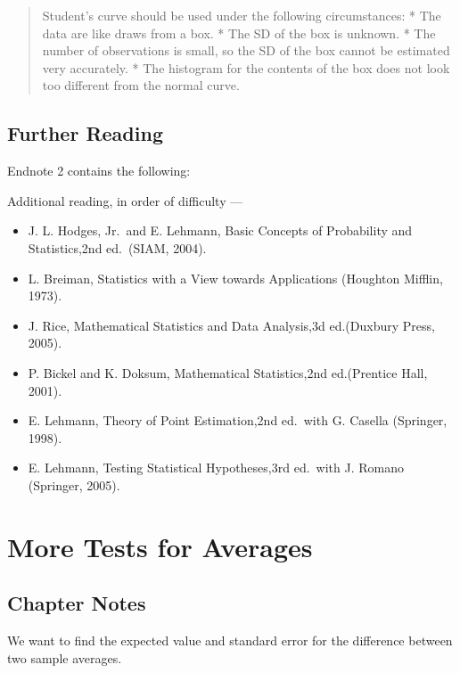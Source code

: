 \documentclass[
]{book}
\providecommand{\tightlist}{%
  \setlength{\itemsep}{0pt}\setlength{\parskip}{0pt}}
\begin{document}
\begin{quote}
Student's curve should be used under the following circumstances:
* The data are like draws from a box.
* The SD of the box is unknown.
* The number of observations is small, so the SD of the box cannot be estimated very accurately.
* The histogram for the contents of the box does not look too different from the normal curve.
\end{quote}

\hypertarget{further-reading-9}{%
\section*{Further Reading}\label{further-reading-9}}

Endnote 2 contains the following:

Additional reading, in order of difficulty ---

\begin{itemize}
\tightlist
\item
  J. L. Hodges, Jr.~and E. Lehmann, Basic Concepts of Probability and Statistics,2nd ed.~(SIAM, 2004).
\item
  L. Breiman, Statistics with a View towards Applications (Houghton Mifflin, 1973).
\item
  J. Rice, Mathematical Statistics and Data Analysis,3d ed.(Duxbury Press, 2005).
\item
  P. Bickel and K. Doksum, Mathematical Statistics,2nd ed.(Prentice Hall, 2001).
\item
  E. Lehmann, Theory of Point Estimation,2nd ed.~with G. Casella (Springer, 1998).
\item
  E. Lehmann, Testing Statistical Hypotheses,3rd ed.~with J. Romano (Springer, 2005).
\end{itemize}

\hypertarget{more_tests_averages}{%
\chapter{More Tests for Averages}\label{more_tests_averages}}

\hypertarget{chapter-notes-26}{%
\section{Chapter Notes}\label{chapter-notes-26}}

We want to find the expected value and standard error for the difference between two sample averages.
\end{document}

